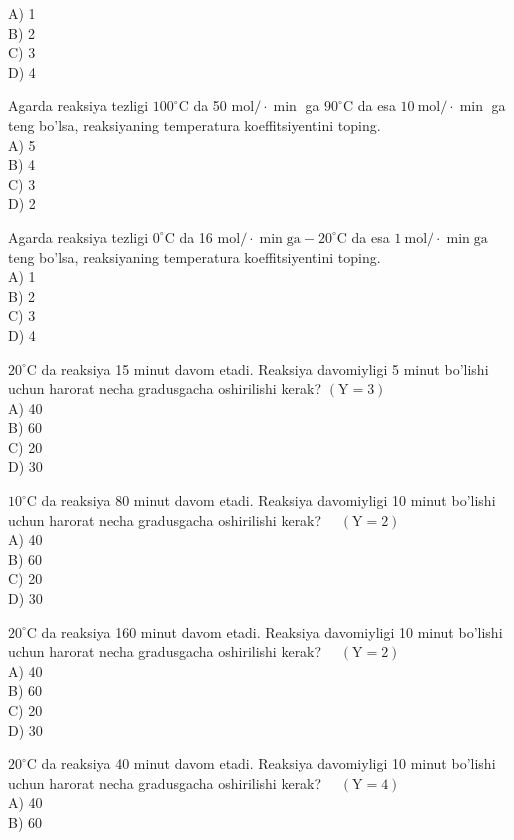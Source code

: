 A) 1\\
B) 2\\
C) 3\\
D) 4
  \item Agarda reaksiya tezligi $100^{\circ} \mathrm{C}$ da 50 $\mathrm{mol} / \cdot \min$ ga $90^{\circ} \mathrm{C}$ da esa $10 \mathrm{~mol} / \cdot \min$ ga teng bo'lsa, reaksiyaning temperatura koeffitsiyentini toping.\\
A) 5\\
B) 4\\
C) 3\\
D) 2
  \item Agarda reaksiya tezligi $0^{\circ} \mathrm{C}$ da 16 $\mathrm{mol} / \cdot \min \mathrm{ga}-20^{\circ} \mathrm{C}$ da esa $1 \mathrm{~mol} / \cdot \min \mathrm{ga}$ teng bo'lsa, reaksiyaning temperatura koeffitsiyentini toping.\\
A) 1\\
B) 2\\
C) 3\\
D) 4
\item $20^{\circ} \mathrm{C}$ da reaksiya 15 minut davom etadi. Reaksiya davomiyligi 5 minut bo'lishi uchun harorat necha gradusgacha oshirilishi kerak? $(\mathrm{Y}=3)$\\
A) 40\\
B) 60\\
C) 20\\
D) 30
  \item $10^{\circ} \mathrm{C}$ da reaksiya 80 minut davom etadi. Reaksiya davomiyligi 10 minut bo'lishi uchun harorat necha gradusgacha oshirilishi kerak? $\quad(\mathrm{Y}=2)$\\
A) 40\\
B) 60\\
C) 20\\
D) 30
  \item $20^{\circ} \mathrm{C}$ da reaksiya 160 minut davom etadi. Reaksiya davomiyligi 10 minut bo'lishi uchun harorat necha gradusgacha oshirilishi kerak? $\quad(\mathrm{Y}=2)$\\
A) 40\\
B) 60\\
C) 20\\
D) 30
  \item $20^{\circ} \mathrm{C}$ da reaksiya 40 minut davom etadi. Reaksiya davomiyligi 10 minut bo'lishi uchun harorat necha gradusgacha oshirilishi kerak? $\quad(\mathrm{Y}=4)$\\
A) 40\\
B) 60\\
